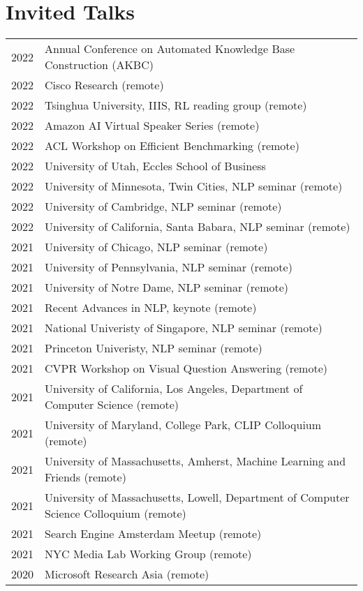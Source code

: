 \documentclass[a4paper,11pt]{article}
\begin{document}
\section{Invited Talks}
\begin{longtable}{rl}
    2022 & Annual Conference on Automated Knowledge Base Construction (AKBC) \\
    2022 & Cisco Research (remote) \\
    2022 & Tsinghua University, IIIS, RL reading group (remote) \\
    2022 & Amazon AI Virtual Speaker Series (remote) \\
    2022 & ACL Workshop on Efficient Benchmarking (remote) \\
    2022 & University of Utah, Eccles School of Business \\
    2022 & University of Minnesota, Twin Cities, NLP seminar (remote) \\
    2022 & University of Cambridge, NLP seminar (remote) \\
    2022 & University of California, Santa Babara, NLP seminar (remote) \\
    2021 & University of Chicago, NLP seminar (remote) \\
    2021 & University of Pennsylvania, NLP seminar (remote) \\
    2021 & University of Notre Dame, NLP seminar (remote) \\
    2021 & Recent Advances in NLP, keynote (remote) \\
    2021 & National Univeristy of Singapore, NLP seminar (remote) \\
    2021 & Princeton Univeristy, NLP seminar (remote) \\
    2021 & CVPR Workshop on Visual Question Answering (remote) \\
    2021 & University of California, Los Angeles, Department of Computer Science (remote) \\
    2021 & University of Maryland, College Park, CLIP Colloquium (remote) \\
    2021 & University of Massachusetts, Amherst, Machine Learning and Friends (remote) \\
    2021 & University of Massachusetts, Lowell, Department of Computer Science Colloquium (remote) \\
    2021 & Search Engine Amsterdam Meetup (remote) \\
    2021 & NYC Media Lab Working Group (remote) \\
    2020 & Microsoft Research Asia (remote) \\

\end{longtable}
\end{document}
